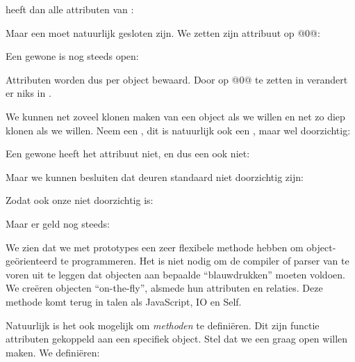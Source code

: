  heeft dan alle attributen van :


Maar een  moet natuurlijk gesloten zijn. We zetten zijn attribuut  op @0@:


Een gewone  is nog steeds open:


Attributen worden dus per object bewaard. Door  op @0@ te zetten in  verandert er niks in .

We kunnen net zoveel klonen maken van een object als we willen en net zo diep klonen als we willen. Neem een , dit is natuurlijk ook een , maar wel doorzichtig:


Een gewone  heeft het attribuut  niet, en dus een  ook niet:


Maar we kunnen besluiten dat deuren standaard niet doorzichtig zijn:


Zodat ook onze  niet doorzichtig is:


Maar er geld nog steeds:


We zien dat we met prototypes een zeer flexibele methode hebben om object-geörienteerd te programmeren. Het is niet nodig om de compiler of parser van te voren uit te leggen dat objecten aan bepaalde ``blauwdrukken'' moeten voldoen. We creëren objecten ``on-the-fly'', alsmede hun attributen en relaties. Deze methode komt terug in talen als JavaScript, IO en Self.

Natuurlijk is het ook mogelijk om \emph{methoden} te definiëren. Dit zijn functie attributen gekoppeld aan een specifiek object. Stel dat we een  graag open willen maken. We definiëren:

